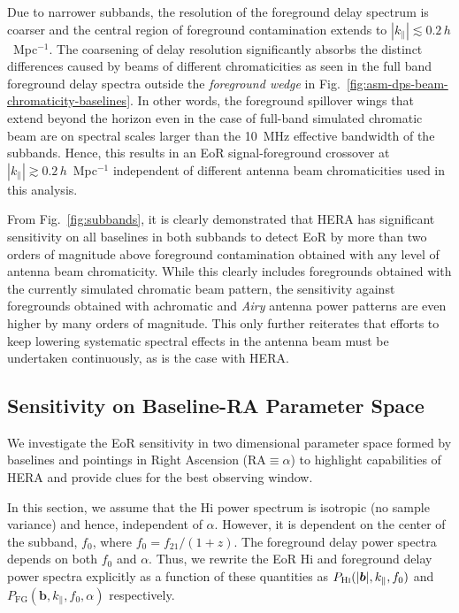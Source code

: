 \documentclass[preprint2,iop,numberedappendix,twocolappendix,appendixfloats]{emulateapj}
\begin{document}
Due to narrower subbands, the resolution of the foreground delay spectrum is coarser and the central region of foreground contamination extends to $|k_\parallel| \lesssim 0.2\,h$~Mpc$^{-1}$. The coarsening of delay resolution significantly absorbs the distinct differences caused by beams of different chromaticities as seen in the full band foreground delay spectra outside the {\it foreground wedge} in Fig.~\ref{fig:asm-dps-beam-chromaticity-baselines}. In other words, the foreground spillover wings that extend beyond the horizon even in the case of full-band simulated chromatic beam are on spectral scales larger than the 10~MHz effective bandwidth of the subbands. Hence, this results in an EoR signal-foreground crossover at $|k_\parallel| \gtrsim 0.2\,h$~Mpc$^{-1}$ independent of different antenna beam chromaticities used in this analysis. 

From Fig.~\ref{fig:subbands}, it is clearly demonstrated that HERA has significant sensitivity on all baselines in both subbands to detect EoR by more than two orders of magnitude above foreground contamination obtained with any level of antenna beam chromaticity. While this clearly includes foregrounds obtained with the currently simulated chromatic beam pattern, the sensitivity against foregrounds obtained with achromatic and {\it Airy} antenna power patterns are even higher by many orders of magnitude. This only further reiterates that efforts to keep lowering systematic spectral effects in the antenna beam must be undertaken continuously, as is the case with HERA.

\subsection{Sensitivity on Baseline-RA Parameter Space}\label{sec:baseline-RA}

We investigate the EoR sensitivity in two dimensional parameter space formed by baselines and pointings in Right Ascension (RA$\equiv\alpha$) to highlight capabilities of HERA and provide clues for the best observing window. 

In this section, we assume that the H{\sc i} power spectrum is isotropic (no sample variance) and hence, independent of $\alpha$. However, it is dependent on the center of the subband, $f_0$, where $f_0 = f_{21}/(1+z)$. The foreground delay power spectra depends on both $f_0$ and $\alpha$. Thus, we rewrite the EoR H{\sc i} and foreground delay power spectra explicitly as a function of these quantities as $P_\textrm{H{\sc i}}(|\boldsymbol{b}|,k_\parallel,f_0)$ and $P_\textrm{FG}(\boldsymbol{b},k_\parallel,f_0,\alpha)$ respectively.
\end{document}
